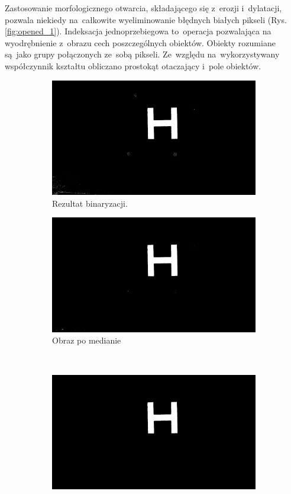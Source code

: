 Zastosowanie morfologicznego otwarcia, składającego się z~erozji i~dylatacji, pozwala niekiedy na~całkowite wyeliminowanie błędnych białych pikseli (Rys. \ref{fig:opened_1}).
Indeksacja jednoprzebiegowa to~operacja pozwalająca na wyodrębnienie z~obrazu cech poszczególnych obiektów. Obiekty rozumiane są~jako grupy połączonych ze~sobą pikseli. Ze~względu na~wykorzystywany współczynnik kształtu obliczano prostokąt otaczający i~pole obiektów. 
\begin{figure}
	\centering
	\begin{subfigure}{0.7\textwidth}
		\centering
		\includegraphics[width=\textwidth]{bin.jpg}
		\caption{Rezultat binaryzacji.}
		\label{fig:bin_1}
	\end{subfigure}
	\begin{subfigure}{0.7\textwidth}
		\centering
		\includegraphics[width=\textwidth]{median.jpg}
		\caption{Obraz po medianie}
		\label{fig:median_1}
	\end{subfigure}\\
	\begin{subfigure}{0.7\textwidth}
		\centering
		\includegraphics[width=\textwidth]{opened.jpg}

\end{subfigure}
\end{figure}
